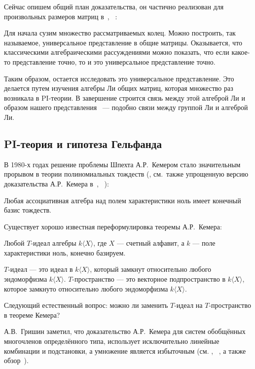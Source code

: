 Сейчас опишем общий план доказательства, он частично реализован для произвольных размеров матриц в\ \cite{Zelmanov1}, ~\cite{Zelmanov2}:

Для начала сузим множество рассматриваемых колец.
Можно построить, так называемое, универсальное представление в общие матрицы.
Оказывается, что классическими алгебраическими рассуждениями можно показать, что если какое-то представление точно, то и это универсальное представление точно.

Таким образом, остается исследовать это универсальное представление.
Это делается путем изучения алгебры Ли общих матриц, которая множество раз возникала в PI-теории.
В завершение строится связь между этой алгеброй Ли и образом нашего представления ~--- подобно связи между группой Ли и алгеброй Ли.

\subsection{PI-теория и гипотеза Гельфанда}\label{subsec:introduction-gelfand}
В 1980-х годах решение проблемы Шпехта А.Р.\ Кемером стало значительным прорывом в теории полиномиальных тождеств (\cite{Kemer}, см.\ также упрощенную версию доказательства А.Р.\ Кемера в~\cite{SimpleKemer}, ~\cite{Procesi}):
\vskip 0.1in\noindent
\begin{theorem*} [А.Р. Кемер, 1987]
    Любая ассоциативная алгебра над полем характеристики ноль имеет конечный базис тождеств.
\end{theorem*}
\vskip 0.1in\noindent

Существует хорошо известная переформулировка теоремы А.Р.\ Кемера:

\vskip 0.1in\noindent
\begin{theorem*}
    Любой $T$-идеал алгебры $k\langle X\rangle$, где $X$ — счетный алфавит, а $k$ — поле характеристики ноль, конечно базируем.
\end{theorem*}
\vskip 0.1in\noindent

$T$-идеал — это идеал в $k\langle X\rangle$, который замкнут относительно любого эндоморфизма $k\langle X\rangle$.
$T$-пространство — это векторное подпространство в $k\langle X\rangle$, которое замкнуто относительно любого эндоморфизма $k\langle X\rangle$.

Следующий естественный вопрос: можно ли заменить $T$-идеал на $T$-пространство в теореме Кемера?

А.В.\ Гришин заметил, что доказательство А.Р.\ Кемера для систем обобщённых многочленов определённого типа, использует исключительно линейные комбинации и подстановки, а умножение является избыточным (см. \cite{Grishin}, ~\cite{Grishin2}, а также обзор~\cite{GrishinSchigolev}).

